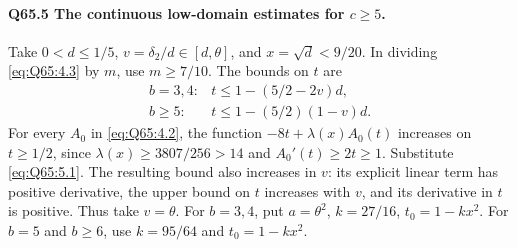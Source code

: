 \paragraph{Q65.5 The continuous low-domain estimates for \(c\ge\allowbreak 5\).}
Take \(0<\allowbreak d\le\allowbreak 1/5\), \(v=\allowbreak \delta_2/d\in[d,\allowbreak \theta]\), and
\(x=\allowbreak \sqrt d<\allowbreak 9/20\). In dividing \eqref{eq:Q65:4.3} by \(m\), use
\(m\ge\allowbreak 7/10\). The bounds on \(t\) are
\begin{equation}\tag{Q65.5.1}\label{eq:Q65:5.1}
\begin{array}{ll}
b=3,4:&t\le1-(5/2-2v)d,\\
b\ge5:&t\le1-(5/2)(1-v)d.
\end{array}
\end{equation}
For every \(A_0\) in \eqref{eq:Q65:4.2}, the function
\(-8t+\lambda(x)A_0(t)\) increases on \(t\ge\allowbreak 1/2\), since
\(\lambda(x)\ge\allowbreak 3807/256>\allowbreak 14\) and \(A_0'(t)\ge\allowbreak 2t\ge\allowbreak 1\).
Substitute \eqref{eq:Q65:5.1}. The resulting bound also increases
in \(v\): its explicit linear term has positive derivative, the
upper bound on \(t\) increases with \(v\), and its derivative in
\(t\) is positive. Thus take \(v=\allowbreak \theta\).
For \(b=\allowbreak 3,\allowbreak 4\), put \(a=\allowbreak \theta^2\), \(k=\allowbreak 27/16\),
\(t_0=\allowbreak 1-kx^2\). For \(b=\allowbreak 5\) and \(b\ge\allowbreak 6\), use \(k=\allowbreak 95/64\)
and \(t_0=\allowbreak 1-kx^2\).

